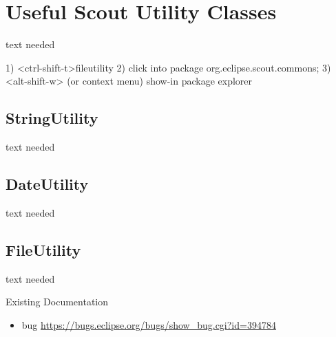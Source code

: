 \documentclass[a4paper,10pt,twoside]{book}
\begin{document}
  \sloppy
\fi


\chapter{Useful Scout Utility Classes}
text needed

1) <ctrl-shift-t>fileutility
2) click into package org.eclipse.scout.commons;
3) <alt-shift-w> (or context menu) show-in package explorer

\section{StringUtility}
text needed


\section{DateUtility}
text needed


\section{FileUtility}
text needed

\noindent Existing Documentation
\begin{itemize}
  \item bug \url{https://bugs.eclipse.org/bugs/show_bug.cgi?id=394784}
\end{itemize}


\ifx\wholebook\relax\else
   
   
\end{document}
